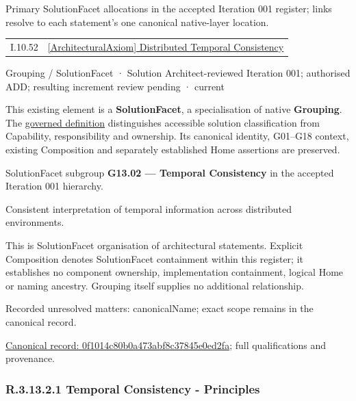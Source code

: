 Primary SolutionFacet allocations in the accepted Iteration 001 register; links resolve to each statement’s one canonical native-layer location.\par
\begin{longtable}{p{.22\linewidth}p{.73\linewidth}}
I.10.52 & \hyperref[element:ed3e8d7923d14f8cbc6f08d3673248f2]{[ArchitecturalAxiom] Distributed Temporal Consistency} \\
\end{longtable}
\label{element:0f1014c80b0a473abf8c37845e0ed2fa}
{\small Grouping / SolutionFacet · Solution Architect-reviewed Iteration 001; authorised ADD; resulting increment review pending · current}\par

This existing element is a \textbf{SolutionFacet}, a specialisation of native
\textbf{Grouping}. The \href{\detokenize{../../../../../../../governance/continuum-representation.md#solutionfacet-classification--1119-candidate}}{governed definition}
distinguishes accessible solution classification from Capability, responsibility
and ownership. Its canonical identity, G01–G18 context, existing Composition
and separately established Home assertions are preserved.



SolutionFacet subgroup \textbf{G13.02 — Temporal Consistency} in the accepted Iteration 001 hierarchy.



Consistent interpretation of temporal information across distributed environments.



This is SolutionFacet organisation of architectural statements. Explicit Composition denotes SolutionFacet containment within this register; it establishes no component ownership, implementation containment, logical Home or naming ancestry. Grouping itself supplies no additional relationship.


{\small Recorded unresolved matters: canonicalName; exact scope remains in the canonical record.}\par
{\footnotesize \href{../../../../../../../continuum/grouping/0f1014c80b0a473abf8c37845e0ed2fa.md}{Canonical record: 0f1014c80b0a473abf8c37845e0ed2fa}; full qualifications and provenance.}\par
\subsubsection*{R.3.13.2.1 Temporal Consistency - Principles}
\label{navigation:R.3.13.2.1}

